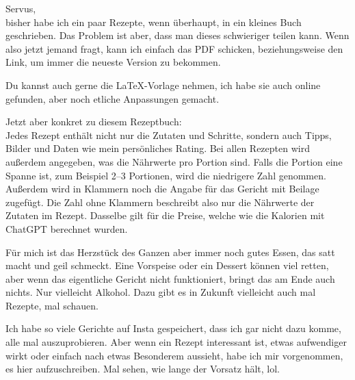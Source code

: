 \documentclass[
  a4paper,
  twoside,
  11pt
]{article}
\begin{document}
\cookbooktitlepage%
\cookbooktocpage%



Servus,\\
bisher habe ich ein paar Rezepte, wenn überhaupt, in ein kleines Buch geschrieben. Das Problem ist aber, dass man dieses schwieriger teilen kann. Wenn also jetzt jemand fragt, kann ich einfach das PDF schicken, beziehungsweise den Link, um immer die neueste Version zu bekommen.

Du kannst auch gerne die LaTeX-Vorlage nehmen, ich habe sie auch online gefunden, aber noch etliche Anpassungen gemacht.

Jetzt aber konkret zu diesem Rezeptbuch:\\
Jedes Rezept enthält nicht nur die Zutaten und Schritte, sondern auch Tipps, Bilder und Daten wie mein persönliches Rating. Bei allen Rezepten wird außerdem angegeben, was die Nährwerte pro Portion sind. Falls die Portion eine Spanne ist, zum Beispiel 2--3 Portionen, wird die niedrigere Zahl genommen. Außerdem wird in Klammern noch die Angabe für das Gericht mit Beilage zugefügt. Die Zahl ohne Klammern beschreibt also nur die Nährwerte der Zutaten im Rezept. Dasselbe gilt für die Preise, welche wie die Kalorien mit ChatGPT berechnet wurden.

Für mich ist das Herzstück des Ganzen aber immer noch gutes Essen, das satt macht und geil schmeckt. Eine Vorspeise oder ein Dessert können viel retten, aber wenn das eigentliche Gericht nicht funktioniert, bringt das am Ende auch nichts. Nur vielleicht Alkohol. Dazu gibt es in Zukunft vielleicht auch mal Rezepte, mal schauen.

Ich habe so viele Gerichte auf Insta gespeichert, dass ich gar nicht dazu komme, alle mal auszuprobieren. Aber wenn ein Rezept interessant ist, etwas aufwendiger wirkt oder einfach nach etwas Besonderem aussieht, habe ich mir vorgenommen, es hier aufzuschreiben. Mal sehen, wie lange der Vorsatz hält, lol.
\end{document}
